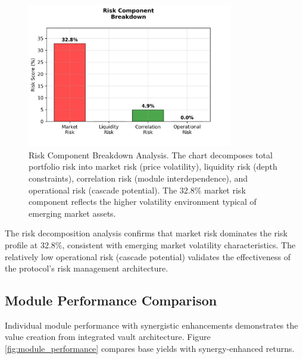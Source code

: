 \documentclass[12pt]{article}
\begin{document}
\begin{figure}[h]
    \centering
    \includegraphics[width=0.8\textwidth]{risk_component_breakdown.jpeg}
    \caption{Risk Component Breakdown Analysis. The chart decomposes total portfolio risk into market risk (price volatility), liquidity risk (depth constraints), correlation risk (module interdependence), and operational risk (cascade potential). The 32.8\% market risk component reflects the higher volatility environment typical of emerging market assets.}
    \label{fig:risk_component_breakdown}
\end{figure}

The risk decomposition analysis confirms that market risk dominates the risk profile at 32.8\%, consistent with emerging market volatility characteristics. The relatively low operational risk (cascade potential) validates the effectiveness of the protocol's risk management architecture.

\subsection{Module Performance Comparison}

Individual module performance with synergistic enhancements demonstrates the value creation from integrated vault architecture. Figure \ref{fig:module_performance} compares base yields with synergy-enhanced returns.
\end{document}
